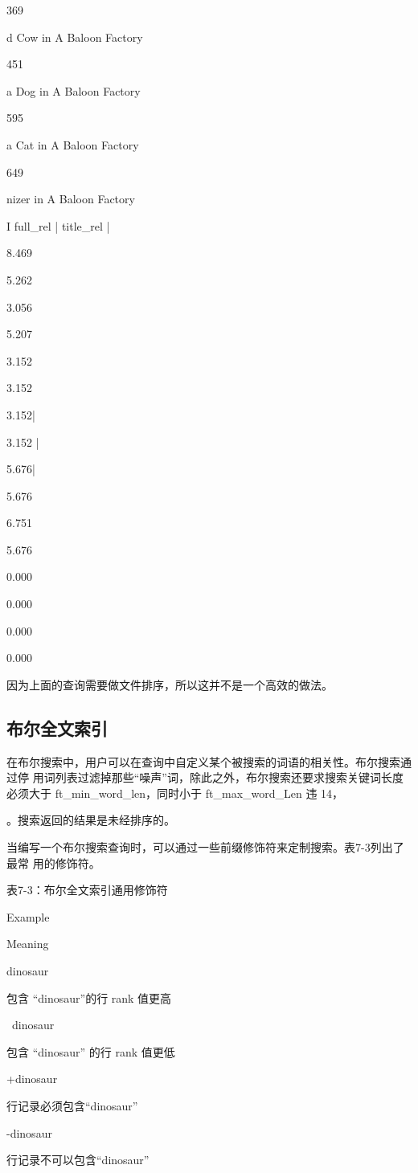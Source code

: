 369

d Cow in A Baloon Factory

451

a Dog in A Baloon Factory

595

a Cat in A Baloon Factory

649

nizer in A Baloon Factory

I full\_rel | title\_rel |

8.469

5.262

3.056

5.207

3.152

3.152

3.152|

3.152 |

5.676|

5.676

6.751

5.676

0.000

0.000

0.000

0.000

因为上面的查询需要做文件排序，所以这并不是一个高效的做法。

\subsection{布尔全文索引}
在布尔搜索中，用户可以在查询中自定义某个被搜索的词语的相关性。布尔搜索通过停
用词列表过滤掉那些“噪声”词，除此之外，布尔搜索还要求搜索关键词长度必须大于
ft\_min\_word\_len，同时小于 ft\_max\_word\_Len 违 14，

。搜索返回的结果是未经排序的。

当编写一个布尔搜索查询时，可以通过一些前缀修饰符来定制搜索。表7-3列出了最常
用的修饰符。

表7-3：布尔全文索引通用修饰符

Example

Meaning

dinosaur

包含 “dinosaur”的行 rank 值更高

~dinosaur

包含 “dinosaur” 的行 rank 值更低

+dinosaur

行记录必须包含“dinosaur”

-dinosaur

行记录不可以包含“dinosaur”

